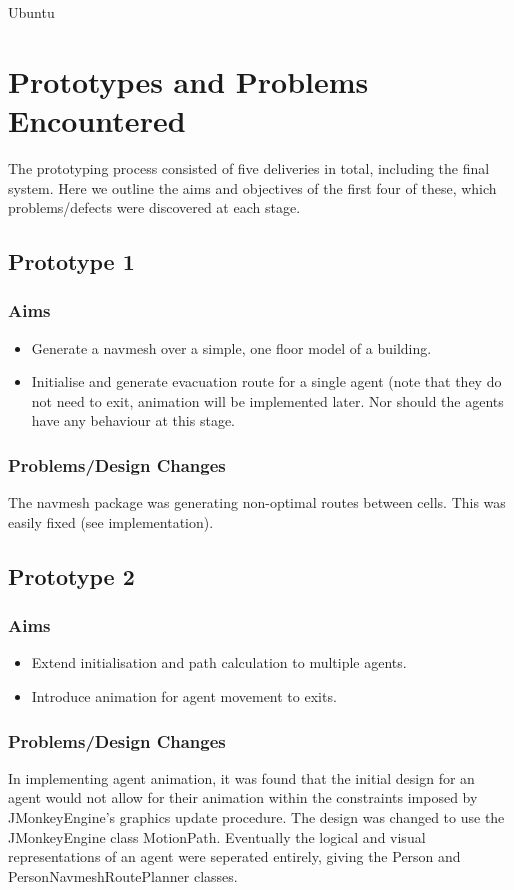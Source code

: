 \documentclass{article}
\begin{document}
Ubuntu
\section{Prototypes and Problems Encountered}
The prototyping process consisted of five deliveries in total, including the final system. Here we outline the aims and objectives of the first four of these, which problems/defects were discovered at each stage.

\subsection{Prototype 1}
\subsubsection{Aims}
\begin{itemize}
\item{Generate a navmesh over a simple, one floor model of a building.}
\item{Initialise and generate evacuation route for a single agent (note that they do not need to exit, animation will be implemented later. Nor should the agents have any behaviour at this stage.}
\end{itemize}
\subsubsection{Problems/Design Changes}
The navmesh package was generating non-optimal routes between cells. This was easily fixed (see implementation).

\subsection{Prototype 2}
\subsubsection{Aims}
\begin{itemize}
\item{Extend initialisation and path calculation to multiple agents.}
\item{Introduce animation for agent movement to exits.}
\end{itemize}
\subsubsection{Problems/Design Changes}
In implementing agent animation, it was found that the initial design for an agent would not allow for their animation within the constraints imposed by JMonkeyEngine's graphics update procedure. The design was changed to use the JMonkeyEngine class MotionPath. Eventually the logical and visual representations of an agent were seperated entirely, giving the Person and PersonNavmeshRoutePlanner classes.
\end{document}
